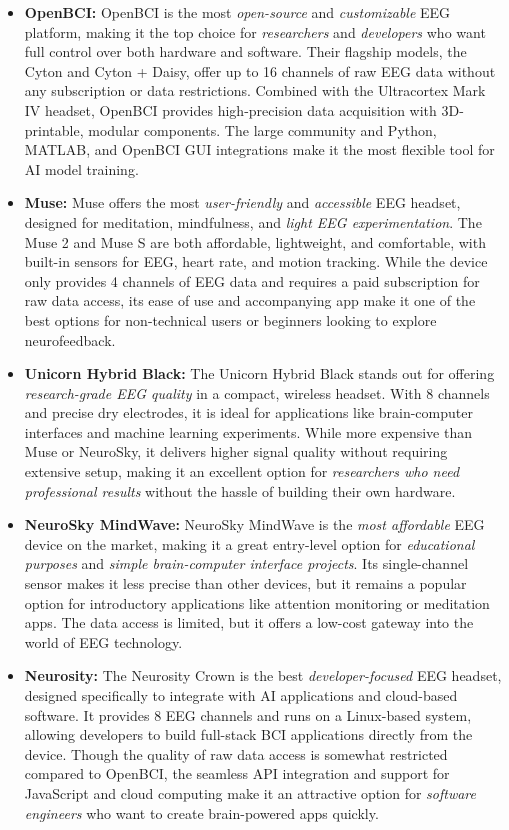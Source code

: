 \documentclass[a4paper]{article}
\begin{document}
\begin{itemize}
    \item \textbf{OpenBCI:} OpenBCI is the most \textit{open-source} and \textit{customizable} EEG platform, making it the top choice for \textit{researchers} and \textit{developers} who want full control over both hardware and software. Their flagship models, the Cyton and Cyton + Daisy, offer up to 16 channels of raw EEG data without any subscription or data restrictions. Combined with the Ultracortex Mark IV headset, OpenBCI provides high-precision data acquisition with 3D-printable, modular components. The large community and Python, MATLAB, and OpenBCI GUI integrations make it the most flexible tool for AI model training.
    \item \textbf{Muse:} Muse offers the most \textit{user-friendly} and \textit{accessible} EEG headset, designed for meditation, mindfulness, and \textit{light EEG experimentation}. The Muse 2 and Muse S are both affordable, lightweight, and comfortable, with built-in sensors for EEG, heart rate, and motion tracking. While the device only provides 4 channels of EEG data and requires a paid subscription for raw data access, its ease of use and accompanying app make it one of the best options for non-technical users or beginners looking to explore neurofeedback.
    \item \textbf{Unicorn Hybrid Black:} The Unicorn Hybrid Black stands out for offering \textit{research-grade EEG quality} in a compact, wireless headset. With 8 channels and precise dry electrodes, it is ideal for applications like brain-computer interfaces and machine learning experiments. While more expensive than Muse or NeuroSky, it delivers higher signal quality without requiring extensive setup, making it an excellent option for \textit{researchers who need professional results} without the hassle of building their own hardware.
    \item \textbf{NeuroSky MindWave:} NeuroSky MindWave is the \textit{most affordable} EEG device on the market, making it a great entry-level option for \textit{educational purposes} and \textit{simple brain-computer interface projects}. Its single-channel sensor makes it less precise than other devices, but it remains a popular option for introductory applications like attention monitoring or meditation apps. The data access is limited, but it offers a low-cost gateway into the world of EEG technology.
    \item \textbf{Neurosity:} The Neurosity Crown is the best \textit{developer-focused} EEG headset, designed specifically to integrate with AI applications and cloud-based software. It provides 8 EEG channels and runs on a Linux-based system, allowing developers to build full-stack BCI applications directly from the device. Though the quality of raw data access is somewhat restricted compared to OpenBCI, the seamless API integration and support for JavaScript and cloud computing make it an attractive option for \textit{software engineers} who want to create brain-powered apps quickly.

\end{itemize}
\end{document}
